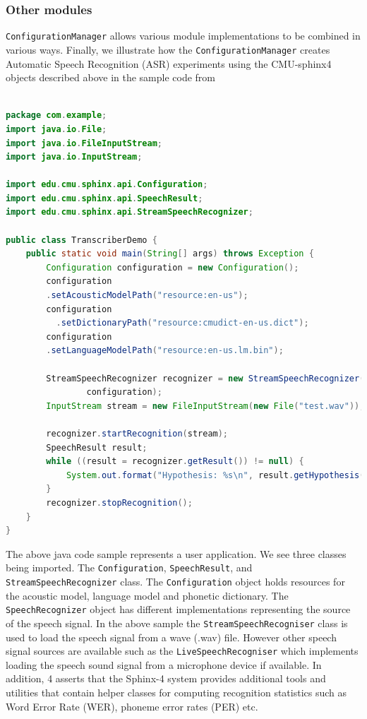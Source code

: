 \subsubsection{Other modules}
\texttt{ConfigurationManager} allows various module implementations to be combined in various ways.  Finally, we illustrate how the \texttt{ConfigurationManager} creates Automatic Speech Recognition (ASR) experiments using the CMU-sphinx4 objects described above in the sample code from \citep{Lamere03thecmu} 
\begin{lstlisting}[language=Java,basicstyle=\small]

package com.example;
import java.io.File;
import java.io.FileInputStream;
import java.io.InputStream;

import edu.cmu.sphinx.api.Configuration;
import edu.cmu.sphinx.api.SpeechResult;
import edu.cmu.sphinx.api.StreamSpeechRecognizer;

public class TranscriberDemo {                                  
    public static void main(String[] args) throws Exception {      
        Configuration configuration = new Configuration();
        configuration
        .setAcousticModelPath("resource:en-us");
        configuration
		  .setDictionaryPath("resource:cmudict-en-us.dict");
        configuration
        .setLanguageModelPath("resource:en-us.lm.bin");

        StreamSpeechRecognizer recognizer = new StreamSpeechRecognizer(
                configuration);
        InputStream stream = new FileInputStream(new File("test.wav"));

        recognizer.startRecognition(stream);
        SpeechResult result;
        while ((result = recognizer.getResult()) != null) {
            System.out.format("Hypothesis: %s\n", result.getHypothesis());
        }
        recognizer.stopRecognition();
    }
}
\end{lstlisting}
The above java code sample represents a user application.  We see three classes being imported. The \texttt{Configuration}, \texttt{SpeechResult}, and \texttt{StreamSpeechRecognizer} class.  The \texttt{Configuration} object holds resources for the acoustic model, language model and phonetic dictionary.  The \texttt{SpeechRecognizer} object has different implementations representing the source of the speech signal.  In the above sample the \texttt{StreamSpeechRecogniser} class is used to load the speech signal from a wave (.wav) file.  However other speech signal sources are available such as the \texttt{LiveSpeechRecogniser} which implements loading the speech sound signal from a microphone device if available.  In addition, \cite{walker2004sphinx} 4 asserts that the Sphinx-4 system provides additional tools and utilities that contain helper classes for computing recognition statistics such as Word Error Rate (WER), phoneme error rates (PER) etc.


